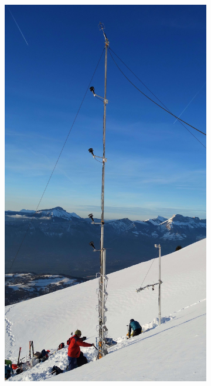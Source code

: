 \begin{figure}[!ht]
    \centering
    \begin{subfigure}[b]{0.308\textwidth}
        \includegraphics[width=\textwidth]{fig/chapter_3/foto_1_small.jpg}
    \end{subfigure}
    \quad
    \begin{subfigure}[b]{0.4\textwidth}

\end{subfigure}
\end{figure}
